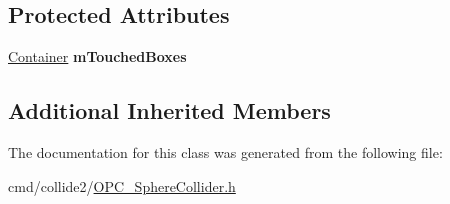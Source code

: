 \subsection*{Protected Attributes}
\begin{DoxyCompactItemize}
\item 
\hyperlink{classContainer}{Container} {\bfseries m\+Touched\+Boxes}\hypertarget{classHybridSphereCollider_a72c848a0c71cfcc0cf4d2757f252bac4}{}\label{classHybridSphereCollider_a72c848a0c71cfcc0cf4d2757f252bac4}

\end{DoxyCompactItemize}
\subsection*{Additional Inherited Members}


The documentation for this class was generated from the following file\+:\begin{DoxyCompactItemize}
\item 
cmd/collide2/\hyperlink{OPC__SphereCollider_8h}{O\+P\+C\+\_\+\+Sphere\+Collider.\+h}\end{DoxyCompactItemize}
